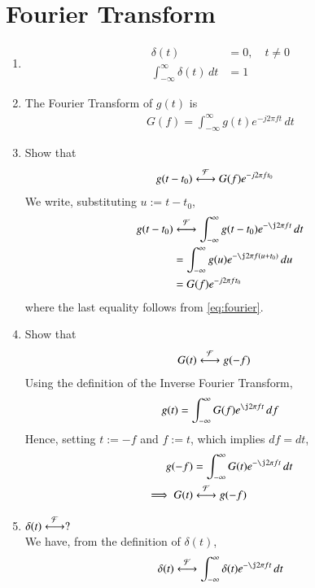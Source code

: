 \documentclass[journal,12pt,twocolumn]{IEEEtran}
\renewcommand\thesection{\arabic{section}}
\begin{document}
\section{Fourier Transform}
\begin{enumerate}[label=\thesection.\arabic*
,ref=\thesection.\theenumi]
\item 
\begin{align}
	\delta(t)&=0, \quad t\neq 0 \\
	\int_{-\infty}^{\infty}\delta(t) \, dt&= 1
\end{align}
\item The Fourier Transform of $g(t)$ is
\begin{align}
G(f)=\int_{-\infty}^{\infty}g(t)e^{-j2\pi ft}\,dt
\label{eq:fourier}
\end{align}
\item Show that 
\begin{align}
    g(t-t_0)&\overset{\mathcal{F}}{ \longleftrightarrow}G(f)e^{-j2\pi ft_0}
    \label{eq:t-shift}
\end{align}
\solution We write, substituting $u := t-t_0$,
\begin{align}
    g(t-t_0)&\system{F}\int_{-\infty}^{\infty}
            g(t-t_0)e^{-\j2\pi ft}\,dt \\
            &=\int_{-\infty}^{\infty}
            g(u)e^{-\j2\pi f(u + t_0)}\,du \\
            &=G(f)e^{-j2\pi ft_0}
\end{align}
where the last equality follows from \eqref{eq:fourier}.
\item Show that
\begin{align}
    G(t)&\overset{\mathcal{F}}{ \longleftrightarrow}g(-f)
\end{align}
\solution Using the definition of the Inverse Fourier Transform,
\begin{align}
    g(t)=\int_{-\infty}^{\infty}G(f)e^{\j2\pi ft}\,df
    \label{eq:duality}
\end{align}
Hence, setting $t := -f$ and $f := t$, which implies $df = dt$,
\begin{align}
    g(-f)&=\int_{-\infty}^{\infty}G(t)e^{-\j2\pi ft}\,dt \\
    \implies G(t)&\system{F}g(-f)
\end{align}
\item $\delta(t)\overset{\mathcal{F}}{ \longleftrightarrow}?$\\
\solution We have, from the definition of $\delta(t)$,
\begin{align}
    \delta(t)&\system{F}\int_{-\infty}^{\infty}\delta(t)e^{-\j2\pi ft}\, dt \\

\end{align}
\end{enumerate}
\end{document}
